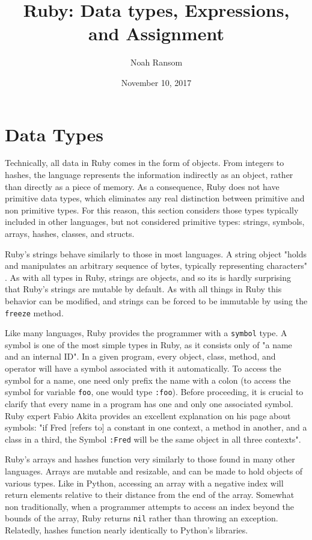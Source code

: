 \documentclass[12pt]{article}
\title{Ruby: Data types, Expressions, and Assignment}
\author{Noah Ransom}
\date{November 10, 2017}
\begin{document}
\maketitle

\pagebreak

\section{Data Types}
Technically, all data in Ruby comes in the form of objects. From integers to hashes, the language represents the information indirectly as an object, rather than directly as a piece of memory. As a consequence, Ruby does not have primitive data types, which eliminates any real distinction between primitive and non primitive types. For this reason, this section considers those types typically included in other languages, but not considered primitive types: strings, symbols, arrays, hashes, classes, and structs.

Ruby's strings behave similarly to those in most languages. A string object "holds and manipulates an arbitrary sequence of bytes, typically representing characters" \cite{docs_string}. As with all types in Ruby, strings are objects, and so its is hardly surprising that Ruby's strings are mutable by default. As with all things in Ruby this behavior can be modified, and strings can be forced to be immutable by using the \verb|freeze| method.

Like many languages, Ruby provides the programmer with a \verb|symbol| type. A symbol is one of the most simple types in Ruby, as it consists only of "a name and an internal ID"\cite{learning_symbols}. In a given program, every object, class, method, and operator will have a symbol associated with it automatically. To access the symbol for a name, one need only prefix the name with a colon (to access the symbol for variable \verb|foo|, one would type \verb|:foo|). Before proceeding, it is crucial to clarify that every name in a program has one and only one associated symbol. Ruby expert Fabio Akita provides an excellent explanation on his page about symbols: "if Fred [refers to] a constant in one context, a method in another, and a class in a third, the Symbol \verb|:Fred| will be the same object in all three contexts"\cite{learning_symbols}.

Ruby's arrays and hashes function very similarly to those found in many other languages. Arrays are mutable and resizable, and can be made to hold objects of various types\cite{learning_arrays}. Like in Python, accessing an array with a negative index will return elements relative to their distance from the end of the array. Somewhat non traditionally, when a programmer attempts to access an index beyond the bounds of the array, Ruby returns \verb|nil| rather than throwing an exception. Relatedly, hashes function nearly identically to Python's libraries\cite{docs_hashes}.
\end{document}
